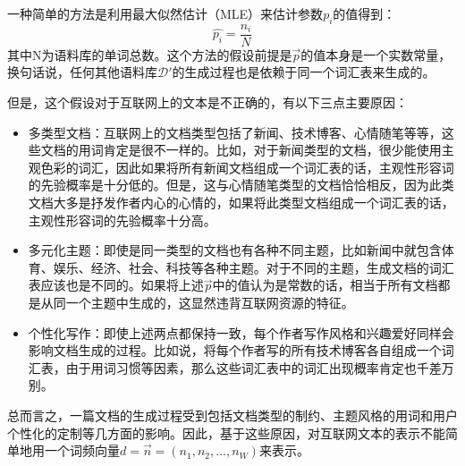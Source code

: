 一种简单的方法是利用最大似然估计（MLE）来估计参数$p_i$的值得到：
\begin{equation}
  \widehat{p_i}=\frac{n_i}{N}
\end{equation}
其中N为语料库的单词总数。这个方法的假设前提是$\vec{p}$的值本身是一个实数常量，换句话说，任何其他语料库$\mathcal{D}'$的生成过程也是依赖于同一个词汇表来生成的。

但是，这个假设对于互联网上的文本是不正确的，有以下三点主要原因：
\begin{itemize}
\item 多类型文档：互联网上的文档类型包括了新闻、技术博客、心情随笔等等，这些文档的用词肯定是很不一样的。比如，对于新闻类型的文档，很少能使用主观色彩的词汇，因此如果将所有新闻文档组成一个词汇表的话，主观性形容词的先验概率是十分低的。但是，这与心情随笔类型的文档恰恰相反，因为此类文档大多是抒发作者内心的心情的，如果将此类型文档组成一个词汇表的话，主观性形容词的先验概率十分高。
\item 多元化主题：即使是同一类型的文档也有各种不同主题，比如新闻中就包含体育、娱乐、经济、社会、科技等各种主题。对于不同的主题，生成文档的词汇表应该也是不同的。如果将上述$\vec{p}$中的值认为是常数的话，相当于所有文档都是从同一个主题中生成的，这显然违背互联网资源的特征。
\item 个性化写作：即使上述两点都保持一致，每个作者写作风格和兴趣爱好同样会影响文档生成的过程。比如说，将每个作者写的所有技术博客各自组成一个词汇表，由于用词习惯等因素，那么这些词汇表中的词汇出现概率肯定也千差万别。
\end{itemize}

总而言之，一篇文档的生成过程受到包括文档类型的制约、主题风格的用词和用户个性化的定制等几方面的影响。因此，基于这些原因，对互联网文本的表示不能简单地用一个词频向量$d=\vec{n}=(n_1,n_2,...,n_W)$来表示。

